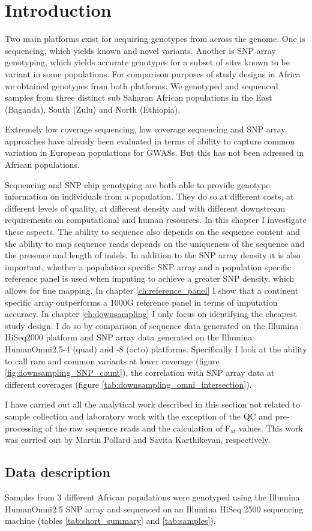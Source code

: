 \section{Introduction}
\label{sec:downsampling_introduction}

Two main platforms exist for acquiring genotypes from across the genome. One is sequencing, which yields known and novel variants. Another is SNP array genotyping, which yields accurate genotypes for a subset of sites known to be variant in some populations. For comparison purposes of study designs in Africa we obtained genotypes from both platforms. We genotyped and sequenced samples from three distinct sub Saharan African populations in the East (Baganda), South (Zulu) and North (Ethiopia).

Extremely low coverage sequencing, low coverage sequencing and SNP array approaches have already been evaluated in terms of ability to capture common variation in European populations for \glspl{GWAS}.\cite{Pasaniuc2012}\cite{10.1371/journal.pcbi.1002604} But this has not been adressed in African populations.

Sequencing and \gls{SNP} chip genotyping are both able to provide genotype information on individuals from a population. They do so at different costs, at different levels of quality, at different density and with different downstream requirements on computational and human resources. In this chapter I investigate these aspects. The ability to sequence also depends on the sequence content and the ability to map sequence reads depends on the uniqueness of the sequence and the presence and length of indels. In addition to the \gls{SNP} array density it is also important, whether a population specific \gls{SNP} array and a population specific reference panel is used when imputing to achieve a greater SNP density, which allows for fine mapping. In chapter \ref{ch:reference_panel} I show that a continent specific array outperforms a 1000G reference panel in terms of imputation accuracy. In chapter \ref{ch:downsampling} I only focus on identifying the cheapest study design. I do so by comparison of sequence data generated on the Illumina HiSeq2000 platform and SNP array data generated on the Illumina HumanOmni2.5-4 (quad) and -8 (octo) platforms. Specifically I look at the ability to call rare and common variants at lower coverage (figure \ref{fig:downsampling_SNP_count}), the correlation with SNP array data at different coverages (figure \ref{tab:downsampling_omni_intersection}).

I have carried out all the analytical work described in this section not related to sample collection and laboratory work with the exception of the QC and pre-processing of the raw sequence reads and the calculation of F$_{st}$ values. This work was carried out by Martin Pollard and Savita Karthikeyan, respectively.

\subsection{Data description}
Samples from 3 different African populations were genotyped using the Illumina HumanOmni2.5 SNP array and sequenced on an Illumina HiSeq 2500 sequencing machine (tables \ref{tab:short_summary} and \ref{tab:samples}).


